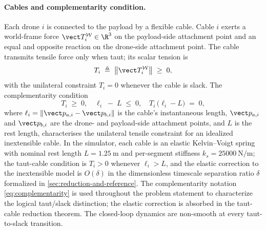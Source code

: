 \paragraph{Cables and complementarity condition.} Each drone $i$ is connected to the payload by a flexible cable. Cable $i$ exerts a world-frame force $\vect T_i^{\mathcal{W}} \in \R^3$ on the payload-side attachment point and an equal and opposite reaction on the drone-side attachment point. The cable transmits tensile force only when taut; its scalar tension is
\begin{equation}
 T_i \;\triangleq\; \bigl\|\vect T_i^{\mathcal{W}}\bigr\|
     \;\ge\; 0,
  \label{eq:tension-def}
\end{equation}
with the unilateral constraint $T_i = 0$ whenever the cable is slack. The complementarity condition
\begin{equation}
 T_i \;\ge\; 0, \quad
  \ell_i \;-\; L \;\le\; 0, \quad
 T_i\,\bigl(\ell_i - L\bigr) \;=\; 0,
  \label{eq:complementarity}
\end{equation}
where $\ell_i = \|\vect p_{a, i} - \vect p_{b, i}\|$ is the cable's instantaneous length, $\vect p_{a, i}$ and $\vect p_{b, i}$ are the drone- and payload-side attachment points, and $L$ is the rest length, characterises the unilateral tensile constraint for an idealized inextensible cable. In the simulator, each cable is an elastic Kelvin--Voigt spring with nominal rest length $L = \SI{1.25}{\metre}$ and per-segment stiffness $k_s = \SI{25000}{\newton\per\metre}$; the taut-cable condition is $T_i > 0$ whenever $\ell_i > L$, and the elastic correction to the inextensible model is $O(\delta)$ in the dimensionless timescale separation ratio $\delta$ formalized in \cref{sec:reduction-and-reference}. The complementarity notation \eqref{eq:complementarity} is used throughout the problem statement to characterize the logical taut/slack distinction; the elastic correction is absorbed in the taut-cable reduction theorem. The closed-loop dynamics are non-smooth at every taut-to-slack transition.

